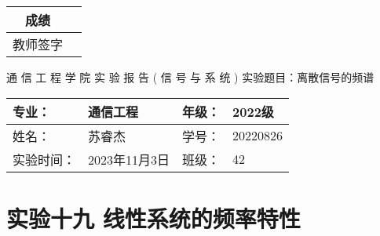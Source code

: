 \documentclass[dvipsnames, svgnames,a4paper,11pt]{article}
\begin{document}
\begin{table}
  \raggedleft
	\renewcommand\arraystretch{1.7}
	\begin{tabular}{|c|p{4em}|}
	\hline
	成绩 &  \\
	\hline
	教师签字 &   \\
	\hline
	\end{tabular}
\end{table}

\begin{center}
	{\kaishu \LARGE   \quad  \quad 通  \quad 信  \quad 工  \quad 程  \quad 学  \quad 院 }
  \newline
  \newline
  \newline
  \newline
  \newline
  {\kaishu \Huge 实 \quad  \quad  \quad 验  \quad  \quad  \quad 报 \quad  \quad  \quad 告}
  \newline
  \newline
  \newline
  \newline
  \newline
  {\songti \Huge  ( \quad  信  \quad 号  \quad 与  \quad 系  \quad 统 \quad)}
  \newline
  \newline
  \newline
  \newline
  \newline
  {\songti  \LARGE 实验题目：离散信号的频谱  \quad  \quad \quad}
\end{center}



\begin{table}[b]
	\renewcommand\arraystretch{1.7}
	\begin{tabularx}{\textwidth}{|X|X|X|X|}
	\hline
	专业：& 通信工程 &年级：& 2022级\\
	\hline
	姓名：& 苏睿杰  & 学号：& 20220826\\
	\hline
	实验时间：& 2023年11月3日 & 班级：& 42 \\
	\hline
	\end{tabularx}
\end{table}



\clearpage
\setcounter{section}{0}
\section{实验十九 \quad 线性系统的频率特性}
	
\end{document}
